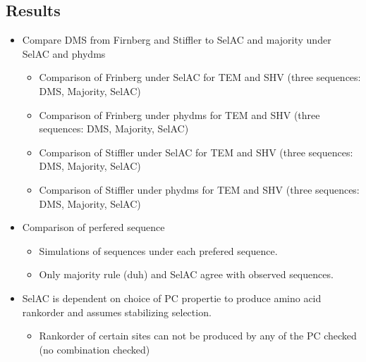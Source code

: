 \documentclass[12pt]{article}
\begin{document}
\begin{itemize}
\section*{Results}
\begin{itemize}
	\item Compare DMS from Firnberg and Stiffler to SelAC and majority under SelAC and phydms
	\begin{itemize}
		\item Comparison of Frinberg under SelAC for TEM and SHV (three sequences: DMS, Majority, SelAC)
		\item Comparison of Frinberg under phydms for TEM and SHV (three sequences: DMS, Majority, SelAC)
		\item Comparison of Stiffler under SelAC for TEM and SHV (three sequences: DMS, Majority, SelAC)
		\item Comparison of Stiffler under phydms for TEM and SHV (three sequences: DMS, Majority, SelAC)
	\end{itemize}
	\item Comparison of perfered sequence
	\begin{itemize}
		\item Simulations of sequences under each prefered sequence.
		\item Only majority rule (duh) and SelAC agree with observed sequences. 
	\end{itemize} 
	\item SelAC is dependent on choice of PC propertie to produce amino acid rankorder and assumes stabilizing selection. 
	\begin{itemize}
		\item Rankorder of certain sites can not be produced by any of the PC checked (no combination checked)
	\end{itemize}
\end{itemize}


\end{itemize}
\end{document}
